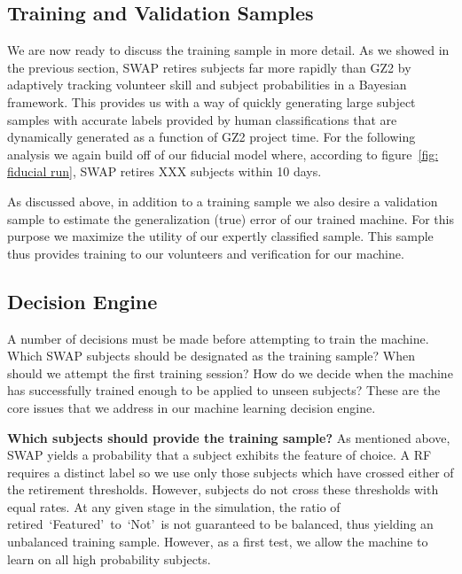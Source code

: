 \documentclass[twocolumn]{aastex6}
\newcommand{\feat}{`Featured'}
\newcommand{\notfeat}{`Not'}
\begin{document}
\subsection{Training and Validation Samples}
We are now ready to discuss the training sample in more detail. As we showed in the previous 
section, SWAP retires subjects far more rapidly than GZ2
by adaptively tracking volunteer skill and subject probabilities in a Bayesian framework.
This provides us with a way of quickly generating large subject samples with accurate
labels provided by human classifications that are dynamically generated as a function
of GZ2 project time. For the following analysis we again build
off of our fiducial model where, according to figure~\ref{fig: fiducial run},
SWAP retires XXX subjects within 10 days. 

As discussed above, in addition to a training sample we also desire a validation 
sample to estimate the generalization (true) error of our trained machine. For 
this purpose we maximize the utility of our expertly classified sample. This sample
thus provides training to our volunteers and verification for our machine. 

\subsection{Decision Engine}\label{sec: decision engine}
A number of decisions must be made before attempting to train the machine. 
Which SWAP subjects should be designated as the training sample? 
When should we attempt the first training session? 
How do we decide when the machine has successfully trained enough to be
applied to unseen subjects? These are the core issues that we address
in our machine learning decision engine.

\textbf{Which subjects should provide the training sample?} As mentioned above, SWAP
yields a probability that a subject exhibits the feature of choice. A RF requires a
distinct label so we use only those subjects which have crossed either of the 
retirement thresholds. However, subjects do not cross these thresholds with equal rates. 
At any given stage in the simulation, the ratio of retired~\feat~to~\notfeat~is not
guaranteed to be balanced, thus yielding an unbalanced training sample.
 However, as a first test, we allow the machine to learn on all high probability subjects. 
\end{document}
